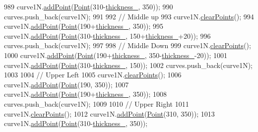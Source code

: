 \begin{DoxyCode}
989     curve1N.\mbox{\hyperlink{class_bezier_curve_a38d16c18b36ae45619b05e26e226cf34}{addPoint}}(\mbox{\hyperlink{class_point}{Point}}(310-\mbox{\hyperlink{class_font_v1_aed8040e76be9a52833627b92f0fb4e5f}{thickness\_}}, 350));
990     curves.push\_back(curve1N);
991 
992     \textcolor{comment}{// Middle up}
993     curve1N.\mbox{\hyperlink{class_bezier_curve_a0ba8ce66d5af5971ae6a1b506029728e}{clearPoints}}();
994     curve1N.\mbox{\hyperlink{class_bezier_curve_a38d16c18b36ae45619b05e26e226cf34}{addPoint}}(\mbox{\hyperlink{class_point}{Point}}(190+\mbox{\hyperlink{class_font_v1_aed8040e76be9a52833627b92f0fb4e5f}{thickness\_}}, 350));
995     curve1N.\mbox{\hyperlink{class_bezier_curve_a38d16c18b36ae45619b05e26e226cf34}{addPoint}}(\mbox{\hyperlink{class_point}{Point}}(310-\mbox{\hyperlink{class_font_v1_aed8040e76be9a52833627b92f0fb4e5f}{thickness\_}}, 150+\mbox{\hyperlink{class_font_v1_aed8040e76be9a52833627b92f0fb4e5f}{thickness\_}}+20));
996     curves.push\_back(curve1N);
997 
998     \textcolor{comment}{// Middle Down}
999     curve1N.\mbox{\hyperlink{class_bezier_curve_a0ba8ce66d5af5971ae6a1b506029728e}{clearPoints}}();
1000     curve1N.\mbox{\hyperlink{class_bezier_curve_a38d16c18b36ae45619b05e26e226cf34}{addPoint}}(\mbox{\hyperlink{class_point}{Point}}(190+\mbox{\hyperlink{class_font_v1_aed8040e76be9a52833627b92f0fb4e5f}{thickness\_}}, 350-\mbox{\hyperlink{class_font_v1_aed8040e76be9a52833627b92f0fb4e5f}{thickness\_}}-20));
1001     curve1N.\mbox{\hyperlink{class_bezier_curve_a38d16c18b36ae45619b05e26e226cf34}{addPoint}}(\mbox{\hyperlink{class_point}{Point}}(310-\mbox{\hyperlink{class_font_v1_aed8040e76be9a52833627b92f0fb4e5f}{thickness\_}}, 150));
1002     curves.push\_back(curve1N);
1003 
1004     \textcolor{comment}{// Upper Left}
1005     curve1N.\mbox{\hyperlink{class_bezier_curve_a0ba8ce66d5af5971ae6a1b506029728e}{clearPoints}}();
1006     curve1N.\mbox{\hyperlink{class_bezier_curve_a38d16c18b36ae45619b05e26e226cf34}{addPoint}}(\mbox{\hyperlink{class_point}{Point}}(190, 350));
1007     curve1N.\mbox{\hyperlink{class_bezier_curve_a38d16c18b36ae45619b05e26e226cf34}{addPoint}}(\mbox{\hyperlink{class_point}{Point}}(190+\mbox{\hyperlink{class_font_v1_aed8040e76be9a52833627b92f0fb4e5f}{thickness\_}}, 350));
1008     curves.push\_back(curve1N);
1009 
1010     \textcolor{comment}{// Upper Right}
1011     curve1N.\mbox{\hyperlink{class_bezier_curve_a0ba8ce66d5af5971ae6a1b506029728e}{clearPoints}}();
1012     curve1N.\mbox{\hyperlink{class_bezier_curve_a38d16c18b36ae45619b05e26e226cf34}{addPoint}}(\mbox{\hyperlink{class_point}{Point}}(310, 350));
1013     curve1N.\mbox{\hyperlink{class_bezier_curve_a38d16c18b36ae45619b05e26e226cf34}{addPoint}}(\mbox{\hyperlink{class_point}{Point}}(310-\mbox{\hyperlink{class_font_v1_aed8040e76be9a52833627b92f0fb4e5f}{thickness\_}}, 350));

\end{DoxyCode}
